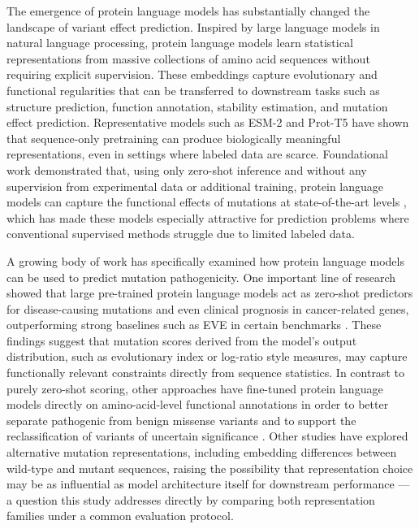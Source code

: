 \documentclass[12pt]{article}
\begin{document}
The emergence of protein language models has substantially changed the landscape of variant effect prediction. Inspired by large language models in natural language processing, protein language models learn statistical representations from massive collections of amino acid sequences without requiring explicit supervision. These embeddings capture evolutionary and functional regularities that can be transferred to downstream tasks such as structure prediction, function annotation, stability estimation, and mutation effect prediction. Representative models such as ESM-2 \cite{esm2} and Prot-T5 \cite{prottrans} have shown that sequence-only pretraining can produce biologically meaningful representations, even in settings where labeled data are scarce. Foundational work demonstrated that, using only zero-shot inference and without any supervision from experimental data or additional training, protein language models can capture the functional effects of mutations at state-of-the-art levels \cite{meier}, which has made these models especially attractive for prediction problems where conventional supervised methods struggle due to limited labeled data.

A growing body of work has specifically examined how protein language models can be used to predict mutation pathogenicity. One important line of research showed that large pre-trained protein language models act as zero-shot predictors for disease-causing mutations and even clinical prognosis in cancer-related genes, outperforming strong baselines such as EVE in certain benchmarks \cite{liu}. These findings suggest that mutation scores derived from the model's output distribution, such as evolutionary index or log-ratio style measures, may capture functionally relevant constraints directly from sequence statistics. In contrast to purely zero-shot scoring, other approaches have fine-tuned protein language models directly on amino-acid-level functional annotations in order to better separate pathogenic from benign missense variants and to support the reclassification of variants of uncertain significance \cite{saadat}. Other studies have explored alternative mutation representations, including embedding differences between wild-type and mutant sequences, raising the possibility that representation choice may be as influential as model architecture itself for downstream performance --- a question this study addresses directly by comparing both representation families under a common evaluation protocol.
\end{document}
